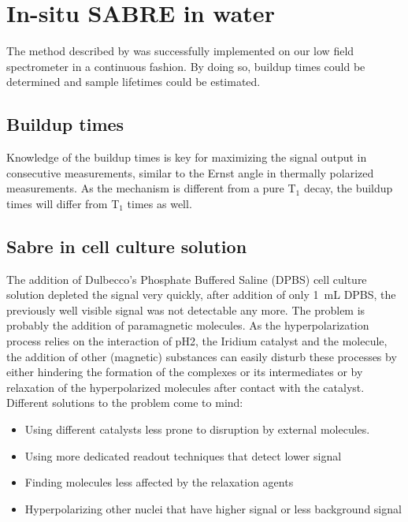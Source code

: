     \section{In-situ SABRE in water}
    The method described by \cite{truong_irreversible_2014-1} was successfully implemented on our low field spectrometer in a continuous fashion. By doing so, buildup times could be determined and sample lifetimes could be estimated.
        \subsection{Buildup times}
            Knowledge of the buildup times is key for maximizing the signal output in consecutive measurements, similar to the Ernst angle in thermally polarized measurements. As the mechanism is different from a pure T$_1$ decay, the buildup times will differ from T$_1$ times as well.
        \subsection{Sabre in cell culture solution}
        \label{sec:discussion:cellSolution}
        The addition of Dulbecco's Phosphate Buffered Saline (DPBS) cell culture solution depleted the signal very quickly, after addition of only \SI{1}{\milli\liter} DPBS, the previously well visible signal was not detectable any more. The problem is probably the addition of paramagnetic molecules. As the hyperpolarization process relies on the interaction of pH2, the Iridium catalyst and the molecule, the addition of other (magnetic) substances can easily disturb these processes by either hindering the formation of the complexes or its intermediates or by relaxation of the hyperpolarized molecules after contact with the catalyst. Different solutions to the problem come to mind: 
            \begin{itemize}
            \setlength{\itemsep}{-7pt}
                \item Using different catalysts less prone to disruption by external molecules.
                \item Using more dedicated readout techniques that detect lower signal
                \item Finding molecules less affected by the relaxation agents
                \item Hyperpolarizing other nuclei that have higher signal or less background signal
            \end{itemize}
